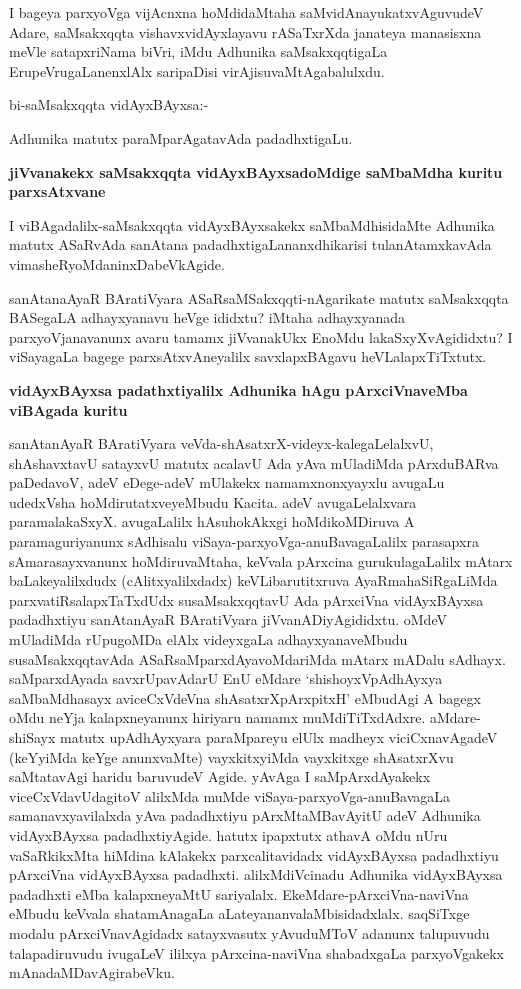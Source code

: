 I bageya parxyoVga vijAcnxna hoMdidaMtaha saMvidAnayukatxvAguvudeV Adare, saMsakxqqta vishavxvidAyxlayavu rASaTxrXda janateya manasisxna meVle satapxriNama biVri, iMdu Adhunika saMsakxqqtigaLa ErupeVrugaLanenxlAlx saripaDisi virAjisuvaMtAgabalulxdu.

bi-saMsakxqqta vidAyxBAyxsa:-

Adhunika matutx paraMparAgatavAda padadhxtigaLu.

\noindent
\textbf{jiVvanakekx saMsakxqqta vidAyxBAyxsadoMdige saMbaMdha kuritu parxsAtxvane}\label{page38}

I viBAgadalilx-saMsakxqqta vidAyxBAyxsakekx saMbaMdhisidaMte Adhunika matutx ASaRvAda sanAtana padadhxtigaLananxdhikarisi tulanAtamxkavAda vimasheRyoMdaninxDabeVkAgide.

sanAtanaAyaR BAratiVyara ASaRsaMSakxqqti-nAgarikate matutx saMsakxqqta BASegaLA adhayxyanavu heVge ididxtu? iMtaha adhayxyanada parxyoVjanavanunx avaru tamamx jiVvanakUkx EnoMdu lakaSxyXvAgididxtu? I viSayagaLa bagege parxsAtxvAneyalilx savxlapxBAgavu heVLalapxTiTxtutx.

\noindent
\textbf{vidAyxBAyxsa padathxtiyalilx Adhunika hAgu pArxciVnaveMba viBAgada kuritu}\label{page38}

sanAtanAyaR BAratiVyara veVda-shAsatxrX-videyx-kalegaLelalxvU, shAshavxtavU satayxvU matutx acalavU Ada yAva mUladiMda pArxduBARva paDedavoV, adeV eDege-adeV mUlakekx namamxnonxyayxlu avugaLu udedxVsha hoMdirutatxveyeMbudu Kacita. adeV avugaLelalxvara paramalakaSxyX. avugaLalilx hAsuhokAkxgi hoMdikoMDiruva A paramaguriyanunx sAdhisalu viSaya-parxyoVga-anuBavagaLalilx parasapxra sAmarasayxvanunx hoMdiruvaMtaha, keVvala pArxcina gurukulagaLalilx mAtarx baLakeyalilxdudx (cAlitxyalilxdadx) keVLibarutitxruva AyaRmahaSiRgaLiMda parxvatiRsalapxTaTxdUdx susaMsakxqqtavU Ada pArxciVna vidAyxBAyxsa padadhxtiyu sanAtanAyaR BAratiVyara jiVvanADiyAgididxtu. oMdeV mUladiMda rUpugoMDa elAlx videyxgaLa adhayxyanaveMbudu susaMsakxqqtavAda ASaRsaMparxdAyavoMdariMda mAtarx
mADalu sAdhayx. saMparxdAyada savxrUpavAdarU EnU eMdare `shishoyxVpAdhAyxya saMbaMdhasayx\label{38} aviceCxVdeVna shAsatxrXpArxpitxH' eMbudAgi A bagegx oMdu neYja kalapxneyanunx hiriyaru namamx muMdiTiTxdAdxre. aMdare-shiSayx matutx upAdhAyxyara paraMpareyu elUlx madheyx viciCxnavAgadeV (keYyiMda keYge anunxvaMte) vayxkitxyiMda vayxkitxge shAsatxrXvu saMtatavAgi haridu baruvudeV Agide. yAvAga I saMpArxdAyakekx viceCxVdavUdagitoV alilxMda muMde viSaya-parxyoVga-anuBavagaLa samanavxyavilalxda yAva padadhxtiyu pArxMtaMBavAyitU adeV Adhunika vidAyxBAyxsa padadhxtiyAgide. hatutx ipapxtutx athavA oMdu nUru vaSaRkikxMta hiMdina kAlakekx parxcalitavidadx vidAyxBAyxsa padadhxtiyu pArxciVna vidAyxBAyxsa padadhxti. alilxMdiVcinadu Adhunika vidAyxBAyxsa padadhxti eMba kalapxneyaMtU sariyalalx. EkeMdare-pArxciVna-naviVna eMbudu keVvala shatamAnagaLa aLateyananvalaMbisidadxlalx. saqSiTxge modalu pArxciVnavAgidadx satayxvasutx yAvuduMToV adanunx talupuvudu talapadiruvudu ivugaLeV ililxya pArxcina-naviVna shabadxgaLa parxyoVgakekx mAnadaMDavAgirabeVku.

